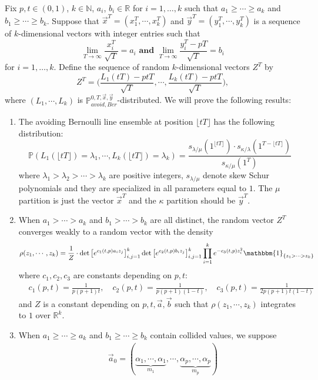 Fix $p,t\in(0,1)$, $k\in\mathbb{N}$, $a_{i}$, $b_{i}\in\mathbb{R}$ for $i=1,\dots,k$ such that $a_{1}\geq \cdots \geq a_{k}$ and $b_{1}\geq \cdots \geq b_{k}$. Suppose that $\vec{x}^{T}=(x_{1}^{T},\cdots,x_{k}^{T})$ and $\vec{y}^{T}=(y_{1}^{T},\cdots,y_{k}^{T})$ is a sequence of $k$-dimensional vectors with integer entries such that $$\lim_{T\rightarrow\infty}\frac{x_{i}^{T}}{\sqrt{T}}=a_{i} \textbf{ and } \lim_{T\rightarrow\infty}\frac{y_{i}^{T}-pT}{\sqrt{T}}=b_{i}$$ for $i=1,\dots,k$. Define the sequence of random $k$-dimensional vectors $Z^{T}$ by $$Z^{T}=\big(\frac{L_{1}(tT)-ptT}{\sqrt{T}},\cdots,\frac{L_{k}(tT)-ptT}{\sqrt{T}}\big),$$ where $(L_{1},\cdots,L_{k})$ is $\mathbb{P}^{0,T,\vec{x},\vec{y}}_{avoid,Ber}$-distributed. We will prove the following results:
\begin{enumerate}
	\item The avoiding Bernoulli line ensemble at position $\lfloor tT \rfloor$ has the following distribution: $$\mathbb{P}(L_{1}(\lfloor tT \rfloor) = \lambda_{1}, \cdots, L_{k}(\lfloor tT \rfloor) = \lambda_{k})=\frac{s_{\lambda/\mu}(1^{\lfloor tT \rfloor})\cdot s_{\kappa/\lambda}(1^{T-\lfloor tT \rfloor})}{s_{\kappa/\mu}(1^{T})}$$ where $\lambda_{1}>\lambda_{2}>\cdots >\lambda_{k}$ are positive integers, $s_{\lambda/\mu}$ denote skew Schur polynomials and they are specialized in all parameters equal to $1$. The $\mu$ partition is just the vector $\vec{x}^{T}$ and the $\kappa$ partition should be $\vec{y}^{T}$.
	\item When $a_{1}> \cdots > a_{k}$ and $b_{1}> \cdots > b_{k}$ are all distinct, the random vector $Z^{T}$ converges weakly to a random vector with the density $$\rho(z_{1},\cdots,z_{k})=\frac{1}{Z}\cdot \det\big[e^{c_{1}(t,p)a_{i}z_{j}}\big]_{i,j=1}^{k}\det\big[e^{c_{2}(t,p)b_{i}z_{j}}\big]_{i,j=1}^{k}\prod_{i=1}^{k}e^{-c_{3}(t,p)z_{i}^{2}}\mathbbm{1}_{\{z_{1}>\cdots >z_{k}\}}$$ where $c_{1},c_{2},c_{3}$ are constants depending on $p,t$: 
	\begin{align*}
		&c_{1}(p,t)=\frac{1}{p(p+1)t}, \quad c_{2}(p,t)=\frac{1}{p(p+1)(1-t)}, \quad c_{3}(p,t)=\frac{1}{2p(p+1)t(1-t)}
	\end{align*}
	and $Z$ is a constant depending on $p,t,\vec{a},\vec{b}$ such that $\rho(z_{1},\cdots,z_{k})$ integrates to $1$ over $\mathbb{R}^{k}$.
	\item When $a_{1}\geq \cdots \geq a_{k}$ and $b_{1}\geq \cdots \geq b_{k}$ contain collided values, we suppose
	\begin{align*}
	&\vec{a}_{0}=(\underbrace{\alpha_{1},\cdots,\alpha_{1}}_{m_{1}},\cdots,\underbrace{\alpha_{p},\cdots,\alpha_{p}}_{m_{p}})\\

\end{align*}
\end{enumerate}
